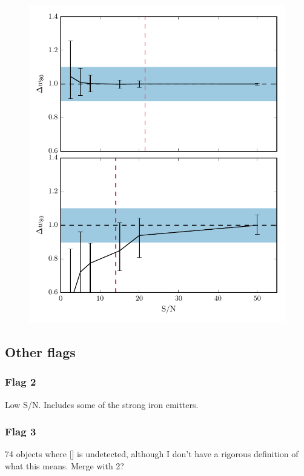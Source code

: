 \begin{figure}
    \centering
    \includegraphics[width=\columnwidth]{figures/chapter04/snr_test.pdf} 
    \caption{}
    \label{fig:snr_test}
\end{figure}


\subsection{Other flags}

\subsubsection{Flag 2}

Low S/N. Includes some of the strong iron emitters. 


\subsubsection{Flag 3}

74 objects where [] is undetected, although I don't have a rigorous definition of what this means. 
Merge with 2? 



